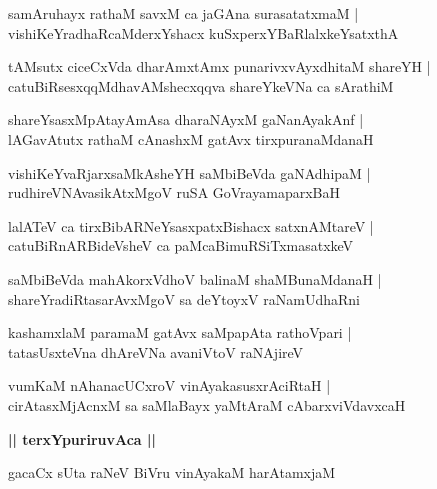 \documentclass[twoside,12pt,openright]{book}
\newcounter{shloka}[chapter]
\def\uvaca#1{\centerline{{\large\textbf{#1}}}}
\begin{document}
\begin{shloka}%
samAruhayx rathaM savxM ca jaGAna surasatatxmaM |\\
vishiKeYradhaRcaMderxYshacx kuSxperxYBaRlalxkeYsatxthA 
\end{shloka}

\begin{shloka}%
tAMsutx ciceCxVda dharAmxtAmx punarivxvAyxdhitaM shareYH |\\
catuBiRsesxqqMdhavAMshecxqqva shareYkeVNa ca sArathiM 
\end{shloka}

\begin{shloka}%
shareYsasxMpAtayAmAsa dharaNAyxM gaNanAyakAnf |\\
lAGavAtutx rathaM cAnashxM gatAvx tirxpuranaMdanaH 
\end{shloka}

\begin{shloka}%
vishiKeYvaRjarxsaMkAsheYH saMbiBeVda gaNAdhipaM |\\
rudhireVNAvasikAtxMgoV ruSA GoVrayamaparxBaH
\end{shloka}

\begin{shloka}%
lalATeV ca tirxBibARNeYsasxpatxBishacx satxnAMtareV |\\
catuBiRnARBideVsheV ca paMcaBimuRSiTxmasatxkeV 
\end{shloka}

\begin{shloka}%
saMbiBeVda mahAkorxVdhoV balinaM shaMBunaMdanaH |\\
shareYradiRtasarAvxMgoV sa deYtoyxV raNamUdhaRni
\end{shloka}

\begin{shloka}%
kashamxlaM paramaM gatAvx saMpapAta rathoVpari |\\
tatasUsxteVna dhAreVNa avaniVtoV raNAjireV 
\end{shloka}

\begin{shloka}%
vumKaM nAhanacUCxroV vinAyakasusxrAciRtaH |\\
cirAtasxMjAcnxM sa saMlaBayx yaMtAraM cAbarxviVdavxcaH 
\end{shloka}

\uvaca{|| terxYpuriruvAca ||}

\begin{shloka}%
gacaCx sUta raNeV BiVru vinAyakaM harAtamxjaM 
\end{shloka}
\end{document}
